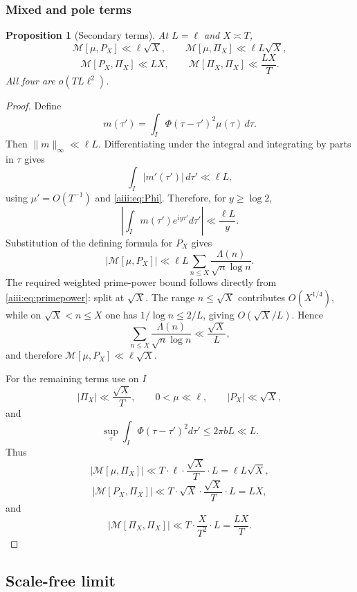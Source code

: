 \documentclass[11pt]{article}
\newtheorem{proposition}[theorem]{Proposition}
\begin{document}
\subsubsection{Mixed and pole terms}

\begin{proposition}[Secondary terms]\label{aiii:prop:secondary}
At $L=\ell$ and $X\asymp T$,
\[
 \mathcal M[\mu,P_X]\ll \ell\sqrt X,
 \qquad
 \mathcal M[\mu,\Pi_X]\ll \ell L\sqrt X,
\]
\[
 \mathcal M[P_X,\Pi_X]\ll LX,
 \qquad
 \mathcal M[\Pi_X,\Pi_X]\ll \frac{LX}{T}.
\]
All four are $o(TL\ell^2)$.
\end{proposition}

\begin{proof}
Define
\[
 m(\tau')=\int_I\Phi(\tau-\tau')^2\mu(\tau)\,d\tau.
\]
Then $\|m\|_\infty\ll\ell L$.  Differentiating under the integral and
integrating by parts in $\tau$ gives
\[
 \int_I|m'(\tau')|\,d\tau'\ll\ell L,
\]
using $\mu'=O(T^{-1})$ and \eqref{aiii:eq:Phi}.  Therefore, for
$y\ge\log2$,
\[
 \left|\int_I m(\tau')e^{iy\tau'}d\tau'\right|
 \ll\frac{\ell L}{y}.
\]
Substitution of the defining formula for $P_X$ gives
\[
 |\mathcal M[\mu,P_X]|
 \ll \ell L
 \sum_{n\le X}\frac{\Lambda(n)}{\sqrt n\log n}.
\]
The required weighted prime-power bound follows directly from
\eqref{aiii:eq:primepower}: split at $\sqrt X$.  The range
$n\le\sqrt X$ contributes $O(X^{1/4})$, while on
$\sqrt X<n\le X$ one has $1/\log n\le2/L$, giving
$O(\sqrt X/L)$.  Hence
\[
 \sum_{n\le X}\frac{\Lambda(n)}{\sqrt n\log n}
 \ll\frac{\sqrt X}{L},
\]
and therefore $\mathcal M[\mu,P_X]\ll\ell\sqrt X$.

For the remaining terms use on $I$
\[
 |\Pi_X|\ll\frac{\sqrt X}{T},\qquad
 0<\mu\ll\ell,\qquad |P_X|\ll\sqrt X,
\]
and
\[
 \sup_\tau\int_I\Phi(\tau-\tau')^2d\tau'\le2\pi bL\ll L.
\]
Thus
\[
 |\mathcal M[\mu,\Pi_X]|
 \ll T\cdot\ell\cdot\frac{\sqrt X}{T}\cdot L
 =\ell L\sqrt X,
\]
\[
 |\mathcal M[P_X,\Pi_X]|
 \ll T\cdot\sqrt X\cdot\frac{\sqrt X}{T}\cdot L=LX,
\]
and
\[
 |\mathcal M[\Pi_X,\Pi_X]|
 \ll T\cdot\frac{X}{T^2}\cdot L=\frac{LX}{T}.
\]
\end{proof}

\subsection{Scale-free limit}
\end{document}
